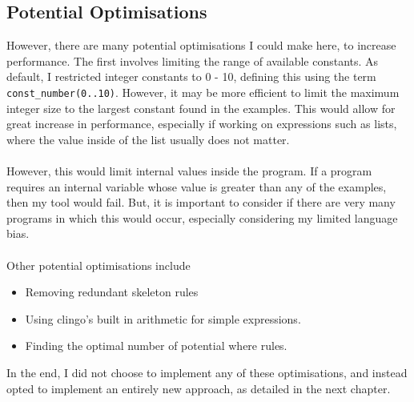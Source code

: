 \subsection{Potential Optimisations}
However, there are many potential optimisations I could make here, to increase performance. The first involves limiting the range of available constants. As default, I restricted integer constants to 0 - 10, defining this using the term \lstinline{const_number(0..10)}. However, it may be more efficient to limit the maximum integer size to the largest constant found in the examples. This would allow for great increase in performance, especially if working on expressions such as lists, where the value inside of the list usually does not matter. \\ \\ %
However, this would limit internal values inside the program. If a program requires an internal variable whose value is greater than any of the examples, then my tool would fail. But, it is important to consider if there are very many programs in which this would occur, especially considering my limited language bias. \\ \\
Other potential optimisations include
\begin{itemize}
\item Removing redundant skeleton rules
\item Using clingo's built in arithmetic for simple expressions.
\item Finding the optimal number of potential where rules.
\end{itemize}
In the end, I did not choose to implement any of these optimisations, and instead opted to implement an entirely new approach, as detailed in the next chapter.

\pagebreak
%
%